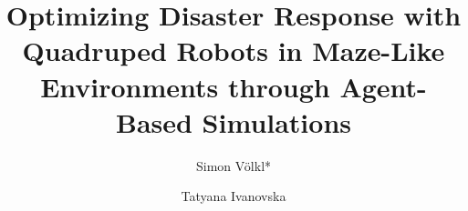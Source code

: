 \documentclass[3p,times,procedia]{elsarticle}
\begin{document}
\begin{frontmatter}



%

\title{Optimizing Disaster Response with Quadruped Robots in Maze-Like Environments through Agent-Based Simulations}




\author[a]{Simon Völkl*}
\author[a]{Tatyana Ivanovska}

\address[a]{Technical University of Applied Sciences Amberg-Weiden, Kaiser-Wilhelm-Ring 23, 92224 Amberg, Germany}


\end{frontmatter}
\end{document}
